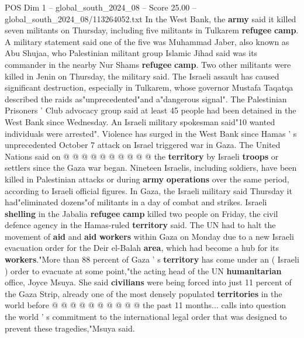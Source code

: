 \begin{textsample}{POS Dim 1 – global\_south\_2024\_08 – Score 25.00 – global\_south\_2024\_08/113264052.txt}
In the West Bank, the \textbf{army} said it killed seven militants on Thursday, including five militants in Tulkarem \textbf{refugee} \textbf{camp}.
A military statement said one of the five was Muhammad Jaber, also known as Abu Shujaa, who Palestinian militant group Islamic Jihad said was its commander in the nearby Nur Shams \textbf{refugee} \textbf{camp}.
Two other militants were killed in Jenin on Thursday, the military said.
The Israeli assault has caused significant destruction, especially in Tulkarem, whose governor Mustafa Taqatqa described the raids as"unprecedented"and a"dangerous signal".
The Palestinian Prisoners ' Club advocacy group said at least 45 people had been detained in the West Bank since Wednesday.
An Israeli military spokesman said"10 wanted individuals were arrested".
Violence has surged in the West Bank since Hamas ' s unprecedented October 7 attack on Israel triggered war in Gaza.
The United Nations said on @ @ @ @ @ @ @ @ @ @ the \textbf{territory} by Israeli \textbf{troops} or settlers since the Gaza war began.
Nineteen Israelis, including soldiers, have been killed in Palestinian attacks or during \textbf{army} \textbf{operations} over the same period, according to Israeli official figures.
In Gaza, the Israeli military said Thursday it had"eliminated dozens"of militants in a day of combat and strikes.
Israeli \textbf{shelling} in the Jabalia \textbf{refugee} \textbf{camp} killed two people on Friday, the civil defence agency in the Hamas-ruled \textbf{territory} said.
The UN had to halt the movement of \textbf{aid} and \textbf{aid} \textbf{workers} within Gaza on Monday due to a new Israeli evacuation order for the Deir el-Balah \textbf{area}, which had become a hub for its \textbf{workers}."More than 88 percent of Gaza ' s \textbf{territory} has come under an ( Israeli ) order to evacuate at some point,"the acting head of the UN \textbf{humanitarian} office, Joyce Msuya.
She said \textbf{civilians} were being forced into just 11 percent of the Gaza Strip, already one of the most densely populated \textbf{territories} in the world before @ @ @ @ @ @ @ @ @ @ the past 11 months... calls into question the world ' s commitment to the international legal order that was designed to prevent these tragedies,"Msuya said.

\end{textsample}
